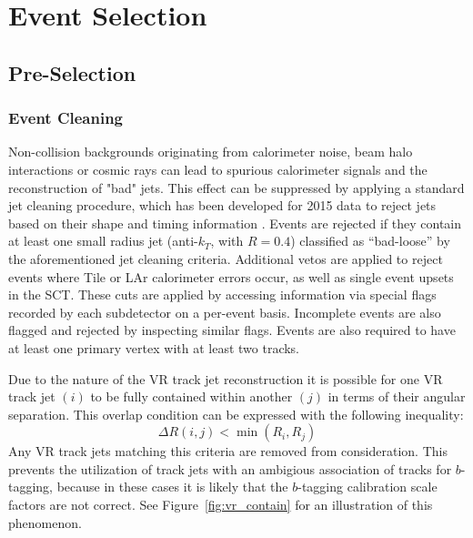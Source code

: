\section{Event Selection}
\label{sec:selection}

\subsection{Pre-Selection}
\label{subsec:presel}

\subsubsection{Event Cleaning}
Non-collision backgrounds originating from calorimeter noise, beam halo interactions or cosmic rays can lead to spurious calorimeter signals and the reconstruction of "bad" jets. This effect can be suppressed by applying a standard jet cleaning procedure, which has been developed for 2015 data to reject jets based on their shape and timing information \cite{jetSelection} . Events are rejected if they contain at least one small radius jet (anti-$k_T$, with $R=0.4$) classified as ``bad-loose'' by the aforementioned jet cleaning criteria.
Additional vetos are applied to reject events where Tile or LAr calorimeter errors occur, as well as single event upsets in the SCT. These cuts are applied by accessing information via special flags recorded by each subdetector on a per-event basis. Incomplete events are also flagged and rejected by inspecting similar flags.
Events are also required to have at least one primary vertex with at least two tracks.

Due to the nature of the VR track jet reconstruction it is possible for one VR track jet $(i)$ to be fully contained within another $(j)$ in terms of their angular separation.
This overlap condition can be expressed with the following inequality:
\begin{equation}
    \Delta R(i,j) < \min(R_i, R_j)
\end{equation}
Any VR track jets matching this criteria are removed from consideration.
This prevents the utilization of track jets with an ambigious association of tracks for $b$-tagging, because in these cases it is likely that the $b$-tagging calibration scale factors are not correct.
See Figure~\ref{fig:vr_contain} for an illustration of this phenomenon.

